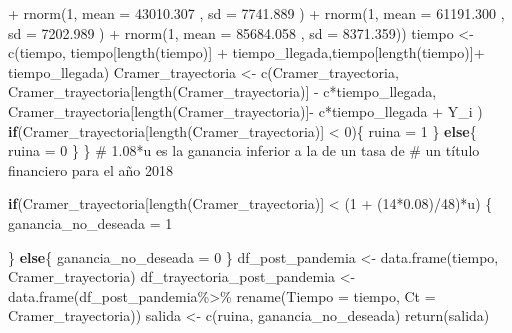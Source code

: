 \documentclass[
  us-letterpaper,
]{scrreprt}
\newenvironment{Shaded}{\begin{snugshade}}{\end{snugshade}}
\newcommand{\AttributeTok}[1]{\textcolor[rgb]{0.40,0.45,0.13}{#1}}
\newcommand{\CommentTok}[1]{\textcolor[rgb]{0.37,0.37,0.37}{#1}}
\newcommand{\ControlFlowTok}[1]{\textcolor[rgb]{0.00,0.23,0.31}{\textbf{#1}}}
\newcommand{\DecValTok}[1]{\textcolor[rgb]{0.68,0.00,0.00}{#1}}
\newcommand{\FloatTok}[1]{\textcolor[rgb]{0.68,0.00,0.00}{#1}}
\newcommand{\FunctionTok}[1]{\textcolor[rgb]{0.28,0.35,0.67}{#1}}
\newcommand{\NormalTok}[1]{\textcolor[rgb]{0.00,0.23,0.31}{#1}}
\newcommand{\OtherTok}[1]{\textcolor[rgb]{0.00,0.23,0.31}{#1}}
\newcommand{\SpecialCharTok}[1]{\textcolor[rgb]{0.37,0.37,0.37}{#1}}
\theoremstyle{definition}
\theoremstyle{plain}
\theoremstyle{plain}
\theoremstyle{remark}
\begin{document}
\begin{Shaded}
\begin{Highlighting}[]
              \SpecialCharTok{+} \FunctionTok{rnorm}\NormalTok{(}\DecValTok{1}\NormalTok{, }\AttributeTok{mean =} \FloatTok{43010.307}\NormalTok{  , }\AttributeTok{sd =} \FloatTok{7741.889}\NormalTok{ ) }
              \SpecialCharTok{+} \FunctionTok{rnorm}\NormalTok{(}\DecValTok{1}\NormalTok{, }\AttributeTok{mean =} \FloatTok{61191.300}\NormalTok{  , }\AttributeTok{sd =} \FloatTok{7202.989}\NormalTok{ ) }
              \SpecialCharTok{+} \FunctionTok{rnorm}\NormalTok{(}\DecValTok{1}\NormalTok{, }\AttributeTok{mean =}  \FloatTok{85684.058}\NormalTok{ , }\AttributeTok{sd =} \FloatTok{8371.359}\NormalTok{)) }
\NormalTok{    tiempo }\OtherTok{\textless{}{-}} \FunctionTok{c}\NormalTok{(tiempo, tiempo[}\FunctionTok{length}\NormalTok{(tiempo)] }\SpecialCharTok{+} 
\NormalTok{                  tiempo\_llegada,tiempo[}\FunctionTok{length}\NormalTok{(tiempo)]}\SpecialCharTok{+} 
\NormalTok{                  tiempo\_llegada) }
\NormalTok{    Cramer\_trayectoria }\OtherTok{\textless{}{-}} \FunctionTok{c}\NormalTok{(Cramer\_trayectoria,}
\NormalTok{    Cramer\_trayectoria[}\FunctionTok{length}\NormalTok{(Cramer\_trayectoria)] }\SpecialCharTok{{-}} 
\NormalTok{      c}\SpecialCharTok{*}\NormalTok{tiempo\_llegada, }
\NormalTok{    Cramer\_trayectoria[}\FunctionTok{length}\NormalTok{(Cramer\_trayectoria)]}\SpecialCharTok{{-}} 
\NormalTok{      c}\SpecialCharTok{*}\NormalTok{tiempo\_llegada }\SpecialCharTok{+}\NormalTok{  Y\_i )}
    \ControlFlowTok{if}\NormalTok{(Cramer\_trayectoria[}\FunctionTok{length}\NormalTok{(Cramer\_trayectoria)] }\SpecialCharTok{\textless{}} \DecValTok{0}\NormalTok{)\{}
\NormalTok{      ruina }\OtherTok{=} \DecValTok{1}
\NormalTok{    \}}
    \ControlFlowTok{else}\NormalTok{\{}
\NormalTok{      ruina }\OtherTok{=} \DecValTok{0}
\NormalTok{    \}}
\NormalTok{  \}}
\CommentTok{\# 1.08*u es la ganancia inferior a la de un tasa de }
\CommentTok{\# un título financiero  para el año 2018}
  
  \ControlFlowTok{if}\NormalTok{(Cramer\_trayectoria[}\FunctionTok{length}\NormalTok{(Cramer\_trayectoria)] }\SpecialCharTok{\textless{}}\NormalTok{ (}\DecValTok{1} \SpecialCharTok{+}\NormalTok{ (}\DecValTok{14}\SpecialCharTok{*}\FloatTok{0.08}\NormalTok{)}\SpecialCharTok{/}\DecValTok{48}\NormalTok{)}\SpecialCharTok{*}\NormalTok{u) \{}
\NormalTok{    ganancia\_no\_deseada }\OtherTok{=} \DecValTok{1}
    
\NormalTok{  \} }
  \ControlFlowTok{else}\NormalTok{\{}
\NormalTok{    ganancia\_no\_deseada }\OtherTok{=} \DecValTok{0}
\NormalTok{  \}}
\NormalTok{  df\_post\_pandemia }\OtherTok{\textless{}{-}} \FunctionTok{data.frame}\NormalTok{(tiempo, Cramer\_trayectoria)}
\NormalTok{  df\_trayectoria\_post\_pandemia }\OtherTok{\textless{}{-}} \FunctionTok{data.frame}\NormalTok{(df\_post\_pandemia}\SpecialCharTok{\%\textgreater{}\%} 
                                  \FunctionTok{rename}\NormalTok{(}\AttributeTok{Tiempo =}\NormalTok{ tiempo,}
                                         \AttributeTok{Ct =}\NormalTok{ Cramer\_trayectoria))}
\NormalTok{  salida }\OtherTok{\textless{}{-}} \FunctionTok{c}\NormalTok{(ruina, ganancia\_no\_deseada)}
  \FunctionTok{return}\NormalTok{(salida)}
  

\end{Highlighting}
\end{Shaded}
\end{document}
